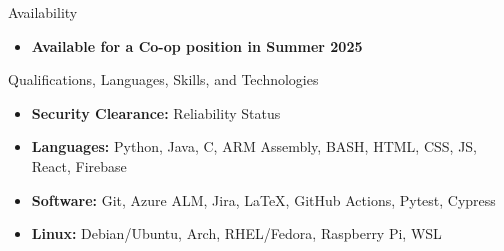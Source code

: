 \documentclass[]{mcdowellcv}
\begin{document}
	\makeheader

	\begin{cvsection}{Availability}
		\begin{cvsubsection}{}{}{}
			\begin{itemize}
				\item \textbf{Available for a Co-op position in Summer 2025}
			\end{itemize}
		\end{cvsubsection}
	\end{cvsection}

	\begin{cvsection}{Qualifications, Languages, Skills, and Technologies}
		\begin{cvsubsection}{}{}{}	
			\begin{itemize}
					\item \textbf{Security Clearance:} Reliability Status
					\item \textbf{Languages:} Python, Java, C, ARM Assembly, BASH, HTML, CSS, JS, React, Firebase
					\item \textbf{Software:} Git, Azure ALM, Jira, \LaTeX, GitHub Actions, Pytest, Cypress
					\item \textbf{Linux:} Debian/Ubuntu, Arch, RHEL/Fedora, Raspberry Pi, WSL
			\end{itemize}
		\end{cvsubsection}
	\end{cvsection}
\end{document}
